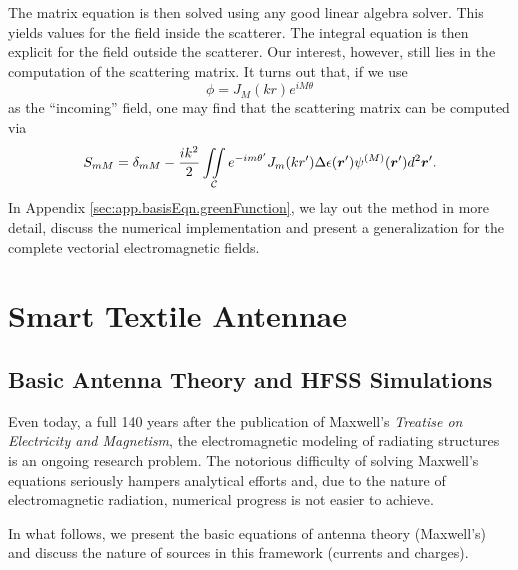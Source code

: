 The matrix equation is then solved using any good 
linear algebra solver. This yields values for the
field inside the scatterer. The integral equation
is then explicit for the field outside the scatterer. 
Our interest, however, still lies in the computation
of the scattering matrix. It turns out that, if we
use 
	\begin{equation}
		\phi = J_M(kr)e^{iM\theta}
	\end{equation}
as the ``incoming'' field, one may find that the scattering
matrix can be computed via
	\begin{equation}
		S_{mM} = \delta_{mM} - \frac{ik^2}{2}\mathop{\iint}_\mathcal{C}e^{-im{\theta'}}J_m(kr')\Delta\epsilon(\boldsymbol{r}')\psi^{(M)}(\boldsymbol{r}')d^2\boldsymbol{r}'.
	\end{equation}
In Appendix \ref{sec:app.basisEqn.greenFunction}, we lay out the method in more detail, 
discuss the numerical implementation and present a generalization for the complete 
vectorial electromagnetic fields.

\section{Smart Textile Antennae}
\subsection{Basic Antenna Theory and HFSS Simulations}
Even today, a full 140 years after the publication of 
Maxwell's \textit{Treatise on Electricity and Magnetism}, 
the electromagnetic modeling of radiating structures 
is an ongoing research problem. The notorious difficulty 
of solving Maxwell's equations seriously hampers analy\-ti\-cal efforts
and, due to the nature of electromagnetic radiation, numerical
progress is not easier to achieve.

In what follows, we present the basic equations of 
antenna theory (Maxwell's) and discuss the nature 
of sources in this framework (currents and charges). 


